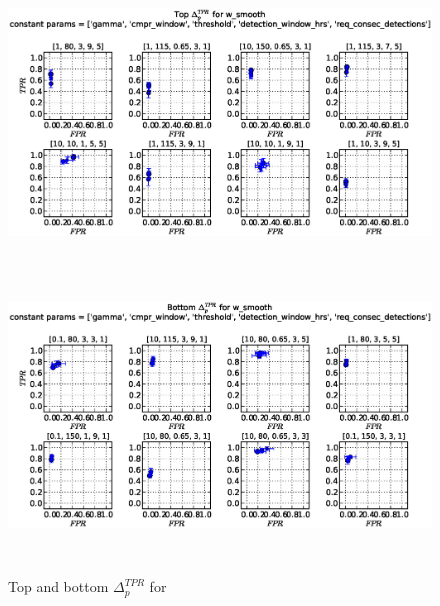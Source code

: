 \begin{figure}[!h]
\begin{center}
\includegraphics[height=3in]{../fig/final/top_tpr/w_smooth}
\includegraphics[height=3in]{../fig/final/bottom_tpr/w_smooth}
\end{center}
\caption{\label{fig:delta_top_bottom4t} Top and bottom $\Delta_p^{TPR}$ for }
\end{figure}


